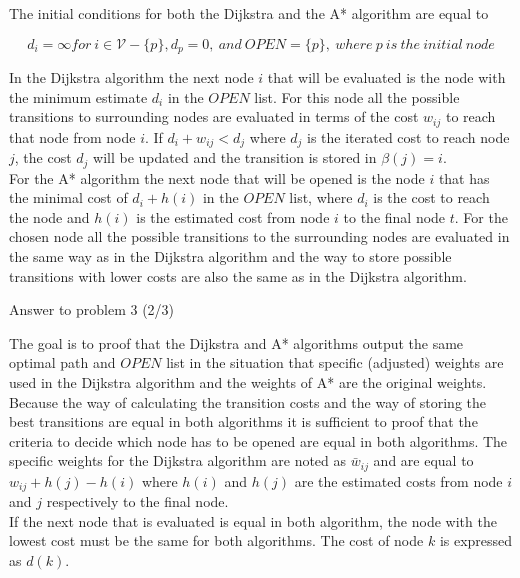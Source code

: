 \documentclass[a4paper]{article}
\begin{document}
The initial conditions for both the Dijkstra and the A* algorithm are equal to

\begin{equation}
d_i = \infty for\ i \in \mathcal{V} -  \{p\},d_p = 0,\ and\  OPEN = \{p\}, \ where \ p \ is \ the \ initial \ node
\end{equation}

In the Dijkstra algorithm the next node $i$ that will be evaluated is the node with the minimum estimate $d_i$ in the $OPEN$ list. 
For this node all the possible transitions to surrounding nodes are evaluated in terms of the cost $w_{ij}$ to reach that node from node $i$. If $d_i + w_{ij} < d_j$ where $d_j$ is the iterated cost to reach node $j$, the cost $d_j$ will be updated and the transition is stored in $\beta(j) = i$.
\\

For the A* algorithm the next node that will be opened is the node $i$ that has the minimal cost of $d_i + h(i)$ in the $OPEN$ list, where $d_i$ is the cost to reach the node and $h(i)$ is the estimated cost from node $i$ to the final node $t$. For the chosen node all the possible transitions to the surrounding nodes are evaluated in the same way as in the Dijkstra algorithm and the  way to store possible transitions with lower costs are also the same as in the Dijkstra algorithm.
\\


\newpage
\thispagestyle{empty}
\noindent	\hrulefill
\begin{flushright}
			Answer to problem 3 (2/3)
\end{flushright}
\noindent	\hrulefill
\vspace{1cm}

The goal is to proof that the Dijkstra and A* algorithms output the same optimal path and $OPEN$ list in the situation that specific (adjusted) weights are used in the Dijkstra algorithm and the weights of A* are the original weights.
Because the way of calculating the transition costs and the way of storing the best transitions are equal in both algorithms it is sufficient to proof that the criteria to decide which node has to be opened are equal in both algorithms.
The specific weights for the Dijkstra algorithm are noted as $\bar{w}_{ij}$ and are equal to $w_{ij} + h(j) - h(i)$ where $h(i)$ and $h(j)$ are the estimated costs from node $i$ and $j$ respectively to the final node. 
\\

If the next node that is evaluated is equal in both algorithm, the node with the lowest cost must be the same for both algorithms. The cost of node $k$ is expressed as $d(k)$.
\\
\end{document}
